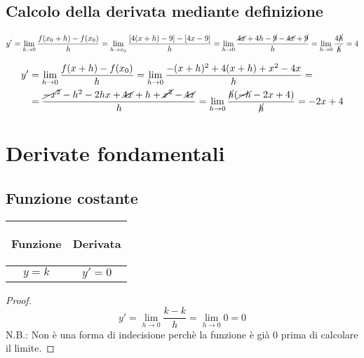\documentclass{book}     %
\begin{document}
\subsection{Calcolo della derivata mediante definizione}
\begin{ex}[Calcolare la derivata di $y=4x-9$ mediante definizione.]
    \[\begin{aligned}y'=\lim_{h\to 0}\frac{f(x_0+h)-f(x_0)}{h}= \lim_{h\to x_0} \frac{\left[ 4(x+h)-9 \right]-\left[ 4x-9 \right]}{h}=\lim_{h\to 0}\frac{\cancel{4x}+4h-\cancel{9}-\cancel{4x}+\cancel{9}}{h}=\lim_{h\to0}\frac{4\cancel{h}}{\cancel{h}}=4\end{aligned}\]
\end{ex}
\begin{ex}[Calcolare la derivata di $y=-x^2+4x$ mediante definizione]
    \[\begin{aligned}
        y'&= \lim_{h\to 0} \frac{f(x+h)-f(x_0)}{h}= \lim_{h\to 0}\frac{-(x+h)^2+4(x+h)+x^2-4x}{h}=\\&=\frac{\cancel{-x^2}-h^2-2hx+\cancel{4x}+h+\cancel{x^2}-\cancel{4x}}{h}= \lim_{h\to 0}\frac{\cancel{h}(\cancel{-h}-2x+4)}{\cancel{h}}=-2x+4
    \end{aligned}\]
\end{ex}
\section{Derivate fondamentali}
\subsection{Funzione costante}
\begin{center}
    \begin{tabular}{m{}|m{}}
        \begin{center}
            \textbf{Funzione}
        \end{center}
        & 
        \begin{center}
            \textbf{Derivata}
        \end{center}\\
        \hline
            \[y=k\]&
            \[y'=0\]
    \end{tabular}
\end{center}
\begin{proof}
    \[y'=\lim_{h\to 0}\frac{k-k}{h}=\lim_{h\to 0}0=0\]
    N.B.: Non è una forma di indecisione perchè la funzione è già 0 prima di calcolare il limite.
\end{proof}
\end{document}

